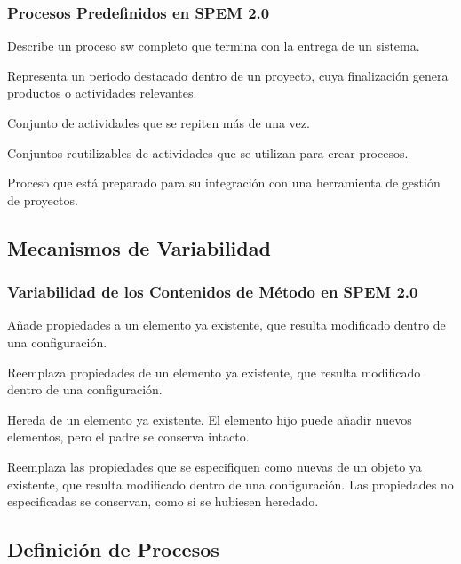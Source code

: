 \documentclass[a4paper,t]{beamer}
\begin{document}
\begin{frame}[c]
    \frametitle{Procesos Predefinidos en SPEM 2.0}
    \begin{description}[<+->]
        \item[Delivery Process] Describe un proceso sw completo que termina con la entrega de un sistema.
        \item[Phase] Representa un periodo destacado dentro de un proyecto, cuya finalización genera productos o actividades relevantes.
        \item[Iteration] Conjunto de actividades que se repiten más de una vez.
        \item[Process Pattern] Conjuntos reutilizables de actividades que se utilizan para crear procesos.
        \item[Process Planning Template] Proceso que está preparado para su integración con una herramienta de gestión de proyectos.
    \end{description}
\end{frame}

\subsection{Mecanismos de Variabilidad}

\begin{frame}[c]
    \frametitle{Variabilidad de los Contenidos de Método en SPEM 2.0}
    \begin{description}[<+->]
        \item[Contributes] Añade propiedades a un elemento ya existente, que resulta modificado dentro de una configuración.
        \item[Replaces] Reemplaza propiedades de un elemento ya existente, que resulta modificado dentro de una configuración.
        \item[Extends] Hereda de un elemento ya existente. El elemento hijo puede añadir nuevos elementos, pero el padre se conserva intacto.
        \item[Extends and Replace] Reemplaza las propiedades que se especifiquen como nuevas de un objeto ya existente, que resulta modificado dentro de una configuración. Las propiedades no especificadas se conservan, como si se hubiesen heredado.
    \end{description}
\end{frame}

\subsection{Definición de Procesos}
\end{document}
